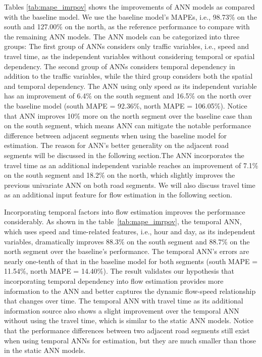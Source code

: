 \documentclass[english]{kththesis}
\begin{document}
Tables \ref{tab:mape_imrpov} shows the improvements of ANN models as compared with the baseline model. We use the baseline model's MAPEs, i.e., 98.73\% on the south and 127.00\% on the north, as the reference performance to compare with the remaining ANN models. The ANN models can be categorized into three groups: The first group of ANNs considers only traffic variables, i.e., speed and travel time, as the independent variables without considering temporal or spatial dependency. The second group of ANNs considers temporal dependency in addition to the traffic variables, while the third group considers both the spatial and temporal dependency. The ANN using only speed as its independent variable has an improvement of 6.4\% on the south segment and 16.5\% on the north over the baseline model (south MAPE = 92.36\%, north MAPE = 106.05\%). Notice that ANN improves 10\% more on the north segment over the baseline case than on the south segment, which means ANN can mitigate the notable performance difference between adjacent segments when using the baseline model for estimation. The reason for ANN's better generality on the adjacent road segments will be discussed in the following section.The ANN incorporates the travel time as an additional independent variable reaches an improvement of 7.1\% on the south segment and 18.2\% on the north, which slightly improves the previous univariate ANN on both road segments. We will also discuss travel time as an additional input feature for flow estimation in the following section.

Incorporating temporal factors into flow estimation improves the performance considerably. As shown in the table~\ref{tab:mape_imrpov}, the temporal ANN, which uses speed and time-related features, i.e., hour and day, as its independent variables, dramatically improves 88.3\% on the south segment and 88.7\% on the north segment over the baseline's performance. The temporal ANN's errors are nearly one-tenth of that in the baseline model for both segments (south MAPE = 11.54\%, north MAPE = 14.40\%). The result validates our hypothesis that incorporating temporal dependency into flow estimation provides more information to the ANN and better captures the dynamic flow-speed relationship that changes over time. The temporal ANN with travel time as its additional information source also shows a slight improvement over the temporal ANN without using the travel time, which is similar to the static ANN models. Notice that the performance differences between two adjacent road segments still exist when using temporal ANNs for estimation, but they are much smaller than those in the static ANN models.
\end{document}
